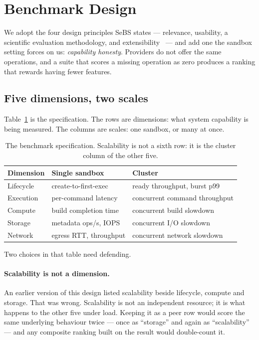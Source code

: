 \section{Benchmark Design}
\label{sec:design}

We adopt the four design principles SeBS states --- relevance, usability, a
scientific evaluation methodology, and extensibility~\cite{sebs2021} --- and
add one the sandbox setting forces on us: \emph{capability honesty}. Providers
do not offer the same operations, and a suite that scores a missing operation
as zero produces a ranking that rewards having fewer features.

\subsection{Five dimensions, two scales}

Table~\ref{tab:dimensions} is the specification. The rows are dimensions: what
system capability is being measured. The columns are scales: one sandbox, or
many at once.

\begin{table}[t]
\caption{The benchmark specification. Scalability is not a sixth row: it is the
cluster column of the other five.}
\label{tab:dimensions}
\small
\begin{tabular}{@{}lll@{}}
\toprule
Dimension & Single sandbox & Cluster \\
\midrule
Lifecycle & create-to-first-exec & ready throughput, burst p99 \\
Execution & per-command latency & concurrent command throughput \\
Compute   & build completion time & concurrent build slowdown \\
Storage   & metadata ops/s, IOPS & concurrent I/O slowdown \\
Network   & egress RTT, throughput & concurrent network slowdown \\
\bottomrule
\end{tabular}
\end{table}

Two choices in that table need defending.

\paragraph{Scalability is not a dimension.} An earlier version of this design
listed scalability beside lifecycle, compute and storage. That was wrong.
Scalability is not an independent resource; it is what happens to the other
five under load. Keeping it as a peer row would score the same underlying
behaviour twice --- once as ``storage'' and again as ``scalability'' ---
and any composite ranking built on the result would double-count it.

